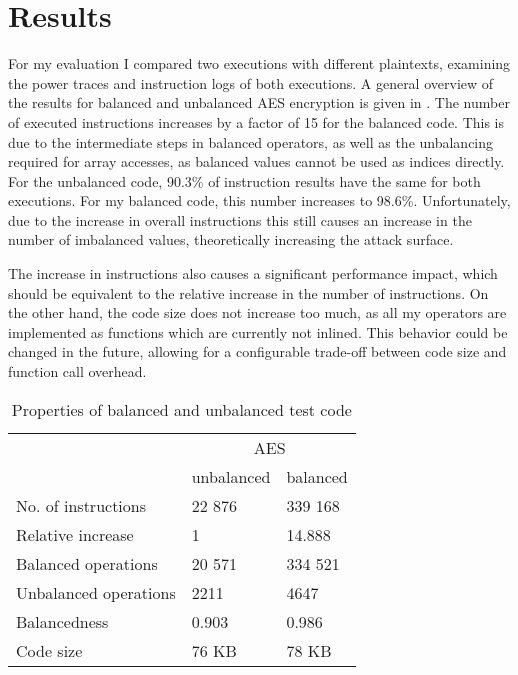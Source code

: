 \chapter{Results}
\label{results}
For my evaluation I compared two executions with different plaintexts, examining the power traces and instruction logs of both executions.
A general overview of the results for balanced and unbalanced AES encryption is given in .
The number of executed instructions increases by a factor of 15 for the balanced code.
This is due to the intermediate steps in balanced operators, as well as the unbalancing required for array accesses, as balanced values cannot be used as indices directly.
For the unbalanced code, 90.3\% of instruction results have the same \hammingw{} for both executions.
For my balanced code, this number increases to 98.6\%.
Unfortunately, due to the increase in overall instructions this still causes an increase in the number of imbalanced values, theoretically increasing the attack surface.

The increase in instructions also causes a significant performance impact, which should be equivalent to the relative increase in the number of instructions.
On the other hand, the code size does not increase too much, as all my operators are implemented as functions which are currently not inlined.
This behavior could be changed in the future, allowing for a configurable trade-off between code size and function call overhead.

\begin{table}[h]
  \centering
  \begin{tabular}{|l|l|l|}
    \hline
    & \multicolumn{2}{c|}{AES} \\
    \cline{2-3}
    & unbalanced & balanced \\
    \cline{2-3}
    No. of instructions & 22 876 & 339 168 \\
    Relative increase & 1 & 14.888 \\
    Balanced operations & 20 571 & 334 521 \\
    Unbalanced operations & 2211 & 4647 \\
    Balancedness      & 0.903 & 0.986 \\
    Code size         & 76 KB & 78 KB \\
    \hline
  \end{tabular}
  \caption{Properties of balanced and unbalanced test code}
  \label{tbl:properties}
\end{table}

